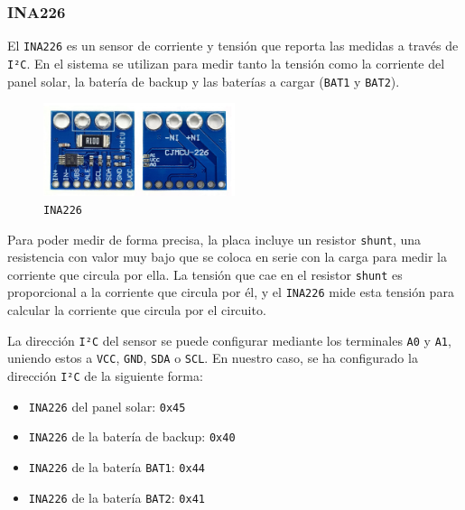 \subsubsection{INA226}

El \texttt{INA226} es un sensor de corriente y tensión que reporta las medidas a través de \texttt{I²C}. En el sistema se utilizan para medir tanto la tensión como la corriente del panel solar, la batería de backup y las baterías a cargar (\texttt{BAT1} y \texttt{BAT2}).\cite{texasinstrumentsINA22636V16Bit}

\begin{figure}[H]
    \centering
    \includegraphics[width=0.5\textwidth]{images/2-hardware/componentes/INA226.jpg}
    \caption{\texttt{INA226}}
    \label{fig:hardware/modulos/ina226}
\end{figure}

Para poder medir de forma precisa, la placa incluye un resistor \texttt{shunt}, una resistencia con valor muy bajo que se coloca en serie con la carga para medir la corriente que circula por ella. La tensión que cae en el resistor \texttt{shunt} es proporcional a la corriente que circula por él, y el \texttt{INA226} mide esta tensión para calcular la corriente que circula por el circuito.

La dirección \texttt{I²C} del sensor se puede configurar mediante los terminales \texttt{A0} y \texttt{A1}, uniendo estos a \texttt{VCC}, \texttt{GND}, \texttt{SDA} o \texttt{SCL}. En nuestro caso, se ha configurado la dirección \texttt{I²C} de la siguiente forma:

\begin{itemize}
    \item \texttt{INA226} del panel solar: \texttt{0x45}
    \item \texttt{INA226} de la batería de backup: \texttt{0x40}
    \item \texttt{INA226} de la batería \texttt{BAT1}: \texttt{0x44}
    \item \texttt{INA226} de la batería \texttt{BAT2}: \texttt{0x41}
\end{itemize}

